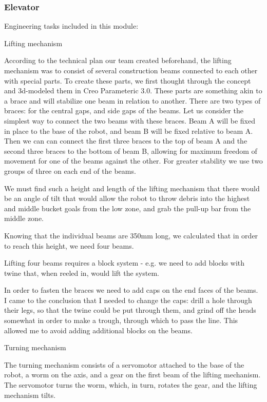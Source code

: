 \subsubsection{Elevator}
  
  Engineering tasks included in this module:
  \begin{enumerate*}
    \item Lifting mechanism 
    \begin{enumerate*}
       \item According to the technical plan our team created beforehand, the lifting mechanism was to consist of several construction beams connected to each other with special parts. To create these parts, we first thought through the concept and 3d-modeled them in Creo Parameteric 3.0. These parts are something akin to a brace and will stabilize one beam in relation to another. There are two types of braces: for the central gaps, and side gaps of the beams. Let us consider the simplest way to connect the two beams with these braces. Beam A will be fixed in place to the base of the robot, and beam B will be fixed relative to beam A. Then we can can connect the first three braces to the top of beam A and the second three braces to the bottom of beam B, allowing for maximum freedom of movement for one of the beams against the other. For greater stability we use two groups of three on each end of the beams. 
       
       \item We must find such a height and length of the lifting mechanism that there would be an angle of tilt that would allow the robot to throw debris into the highest and middle bucket goals from the low zone, and grab the pull-up bar from the middle zone. 
       
       \item Knowing that the individual beams are 350mm long, we calculated that in order to reach this height, we need four beams.  
       
       \item Lifting four beams requires a block system - e.g. we need to add blocks with twine that, when reeled in, would lift the system. 
       
       \item In order to fasten the braces we need to add caps on the end faces of the beams. I came to the conclusion that I needed to change the caps: drill a hole through their legs, so that the twine could be put through them, and grind off the heads somewhat in order to make a trough, through which to pass the line. This allowed me to avoid adding additional blocks on the beams. 
    \end{enumerate*}
    \item Turning mechanism
    \begin{enumerate*}
       \item The turning mechanism consists of a servomotor attached to the base of the robot, a worm on the axis, and a gear on the first beam of the lifting mechanism. The servomotor turns the worm, which, in turn, rotates the gear, and the lifting mechanism tilts. 
    \end{enumerate*}
    

\end{enumerate*}
